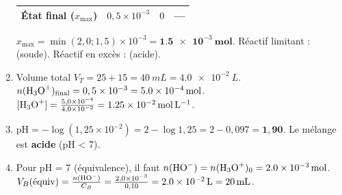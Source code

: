 \documentclass[11pt]{article}
\begin{document}
\begin{exoresolu}
\begin{enumerate}
\begin{center}
\begin{tabular}{|c|c|c|c|}
État final ($x_{\max}$) & $0,5 \times 10^{-3}$ & $0$ & --- \\\hline
\end{tabular}
\end{center}
$x_{\max} = \min(2,0; 1,5) \times 10^{-3} = \mathbf{\SI{1,5e-3}{mol}}$.
Réactif limitant :  (soude). Réactif en excès :  (acide).
\item Volume total $V_T = 25 + 15 = \SI{40}{mL} = \SI{4,0e-2}{L}$.
$n(\ce{H3O+})_{\text{final}} = 0,5 \times 10^{-3} = \SI{5,0e-4}{mol}$.
$[\ce{H3O+}] = \frac{5,0 \times 10^{-4}}{4,0 \times 10^{-2}} = \mathbf{\SI{1,25e-2}{mol.L^{-1}}}$.
\item $\mathrm{pH} = -\log(1,25 \times 10^{-2}) = 2 - \log 1,25 = 2 - 0,097 = \mathbf{1,90}$.
Le mélange est \textbf{acide} (pH < 7).
\item Pour pH = 7 (équivalence), il faut $n(\ce{HO-}) = n(\ce{H3O+})_0 = \SI{2,0e-3}{mol}$.
$V_B(\text{équiv}) = \frac{n(\ce{HO-})}{C_B} = \frac{2,0 \times 10^{-3}}{0,10} = \SI{2,0e-2}{L} = \mathbf{\SI{20}{mL}}$.
\end{enumerate}
\end{exoresolu}
\end{document}
